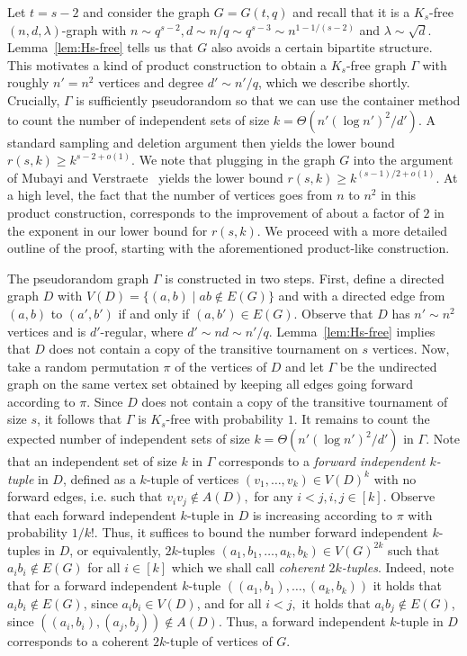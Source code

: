\documentclass{article}
\theoremstyle{plain}
\theoremstyle{definition}
\begin{document}
    Let $t = s-2$ and consider the graph $G = G(t, q)$ and recall that it is a $K_s$-free $(n, d, \lambda)$-graph with $n \sim q^{s-2}, d \sim n/ q \sim q^{s-3} \sim n^{1 - 1 / (s-2)}$ and $\lambda \sim \sqrt{d}$. Lemma~\ref{lem:Hs-free} tells us that $G$ also avoids a certain bipartite structure. This motivates a kind of product construction to obtain a $K_s$-free graph $\Gamma$ with roughly $n' = n^2$ vertices and degree $d' \sim n' / q$, which we describe shortly. Crucially, $\Gamma$ is sufficiently pseudorandom so that we can use the container method to count the number of independent sets of size $k = \Theta(n' (\log n')^2 / d')$. A standard sampling and deletion argument then yields the lower bound $r(s, k) \ge k^{s-2+o(1)}.$ We note that plugging in the graph $G$ into the argument of Mubayi and Verstraete~\cite{mubayi-verstraete} yields the lower bound $r(s, k) \ge k^{(s-1)/2 + o(1)}$. At a high level, the fact that the number of vertices goes from $n$ to $n^2$ in this product construction, corresponds to the improvement of about a factor of $2$ in the exponent in our lower bound for $r(s, k)$. We proceed with a more detailed outline of the proof, starting with the aforementioned product-like construction.

    The pseudorandom graph $\Gamma$ is constructed in two steps. First, define a directed graph $D$ with $V(D) = \{ (a, b) \mid ab \not\in E(G)\}$ and with a directed edge from $(a, b)$ to $(a', b')$ if and only if $(a, b') \in E(G)$. Observe that $D$ has $n' \sim n^2$ vertices and is $d'$-regular, where $d' \sim nd \sim n' / q$. Lemma~\ref{lem:Hs-free} implies that $D$ does not contain a copy of the transitive tournament on $s$ vertices. Now, take a random permutation $\pi$ of the vertices of $D$ and let $\Gamma$ be the undirected graph on the same vertex set obtained by keeping all edges going forward according to $\pi$. Since $D$ does not contain a copy of the transitive tournament of size $s$, it follows that $\Gamma$ is $K_s$-free with probability $1$. It remains to count the expected number of independent sets of size $k = \Theta(n' (\log n')^2 / d')$ in $\Gamma$. Note that an independent set of size $k$ in $\Gamma$ corresponds to a \emph{forward independent $k$-tuple} in $D$, defined as a $k$-tuple of vertices $(v_1, \dots, v_k) \in V(D)^k$ with no forward edges, i.e. such that $v_i v_j \not\in A(D),$ for any $i < j, i,j \in [k]$. Observe that each forward independent $k$-tuple in $D$ is increasing according to $\pi$ with probability $1/k!$. Thus, it suffices to bound the number forward independent $k$-tuples in $D$, or equivalently, $2k$-tuples $(a_1, b_1, \dots, a_k, b_k) \in V(G)^{2k}$ such that $a_i b_i \not\in E(G)$ for all $i \in [k]$ which we shall call \emph{coherent $2k$-tuples}. Indeed, note that for a forward independent $k$-tuple $((a_1, b_1), \dots, (a_k, b_k))$ it holds that $a_i b_i \not \in E(G)$, since $a_ib_i \in V(D)$, and for all $i < j,$ it holds that $a_i b_j \not\in E(G)$, since $((a_i, b_i), (a_j, b_j)) \not\in A(D)$. Thus, a forward independent $k$-tuple in $D$ corresponds to a coherent $2k$-tuple of vertices of $G$.
\end{document}
